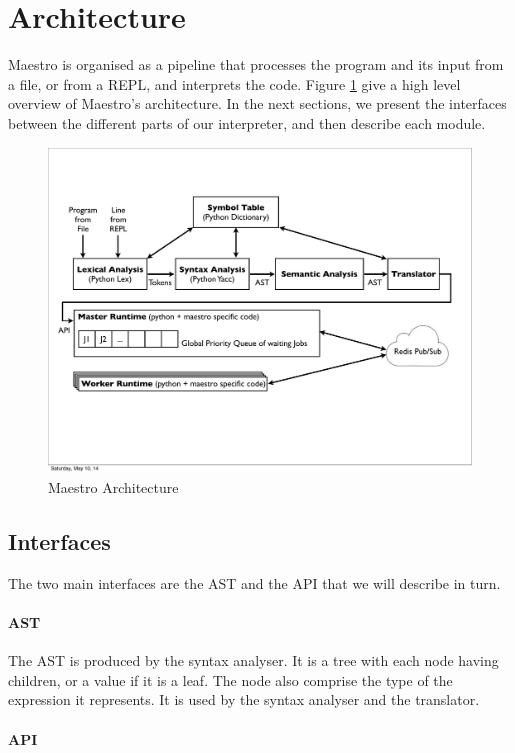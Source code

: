 \section{Architecture}
Maestro is organised as a pipeline that processes the program and its input from a file, or from a REPL, and interprets the code. Figure \ref{fig:archi} give a high level overview of Maestro's architecture.
In the next sections, we present the interfaces between the different parts of our interpreter, and then describe each module.

\begin{figure}[h!]
  \centering
  \includegraphics[width=15cm]{figures/archi.pdf}
  \caption{Maestro Architecture}
\label{fig:archi}
\end{figure}

\subsection{Interfaces}
The two main interfaces are the AST and the API that we will describe in turn.

\paragraph{AST}

The AST is produced by the syntax analyser.
It is a tree with each node having children, or a value if it is a leaf.
The node also comprise the type of the expression it represents.
It is used by the syntax analyser and the translator.

\paragraph{API}

